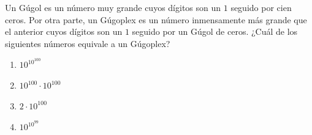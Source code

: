 \begin{problem}
    Un Gúgol es un número muy grande cuyos dígitos son un $1$ seguido por cien ceros. Por otra parte, un Gúgoplex es un número inmensamente más grande que el anterior cuyos dígitos son un $1$ seguido por un Gúgol de ceros. ¿Cuál de los siguientes números equivale a un Gúgoplex?

    \begin{enumerate}[label=\Alph*.]
        \item $10^{10^{100}}$
        \item $10^{100} \cdot 10^{100}$
        \item $2 \cdot 10^{100}$
        \item $10^{10^{99}}$
    \end{enumerate}
\end{problem}
